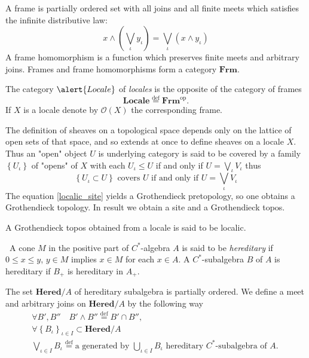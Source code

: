 \documentclass{beamer}
\theoremstyle{plain}
\newcommand{\bean}{\begin{eqnarray*}}
\newcommand{\eean}{\end{eqnarray*}}
\newcommand{\be}{\begin{equation}}
\newcommand{\ee}{\end{equation}}
\newcommand{\bydef}{\stackrel{\mathrm{def}}{=}}
\begin{document}
\begin{frame}
	\begin{definition}\label{frame_defn}
	A \alert{frame} is partially  ordered set with all joins and all finite meets which satisfies the infinite distributive law:
	$$
	x \wedge \left( \bigvee_\iota y_\iota \right) = \bigvee_\iota\left(x\wedge   y_\iota \right) 
	$$
	A \alert{frame homomorphism} 
	is a function which preserves finite meets and arbitrary joins. Frames and frame homomorphisms form a category $\mathbf{Frm}$.
\end{definition}
\begin{definition}\label{locale_defn}
	The category $\alert{ Locale}$ of \textit{locales} is the opposite of the category of frames
	$$
	\mathbf{ Locale} \bydef \mathbf{Frm}^\text{op}.
	$$
	If $X$ is  a locale  denote by $\mathcal O\left( X\right)$ the corresponding  frame.
\end{definition}
\end{frame}
\begin{frame}
The definition  of sheaves on a topological space depends
only on the lattice of open sets of that space, and so extends at once to
define sheaves on a locale $X$. Thus an "open" object $U$ is underlying category is said to be
covered by a family $\left\{U_\iota \right\}$ of "opens" of $X$ with each $U_\iota \le U$  if and only if $U= \bigvee_\iota V_\iota$ thus
\be\label{localic_site}
\left\{U_\iota\subset U \right\} \text{ covers } U \text{ if and only if } U= \bigvee_\iota V_\iota
\ee
The equation \eqref{localic_site} yields a Grothendieck pretopology, so one obtains a Grothendieck topology. In result we obtain a site and a Grothendieck topos.
\begin{definition}\label{localic_topos_defn}
	A Grothendieck topos obtained from a locale is said to be \alert{localic}.
\end{definition}
\end{frame}
\begin{frame}
		\begin{definition}\label{hered_defn}\
		A cone $M$ in the positive part of $C^*$-algebra $A$ is said to be \textit{hereditary} if $0 \le x \le y$, $y \in M$ implies $x \in M$ for each $x \in A$. A $C^*$-subalgebra $B$ of $A$ is \alert{hereditary} if $B_+$ is hereditary in $A_+$.
	\end{definition}
The set   $\mathbf{Hered}/A$ of hereditary subalgebra is  partially ordered.
We define a meet and arbitrary joins on $\mathbf{Hered}/A$ by the following way
\bean
\forall B', B'' \quad B' \wedge B'' \bydef B'\cap B'',~\\\label{join_eqn}
\forall  \left\{B_\iota\right\}_{\iota\in I} \subset  \mathbf{Hered}/A \\ \bigvee_{\iota \in I} B_\iota  \bydef \text{a generated by } \bigcup_{\iota \in I} B_\iota \text{ hereditary } C^*\text{-subalgebra of } A.~ 
\eean
\end{frame}
\end{document}
